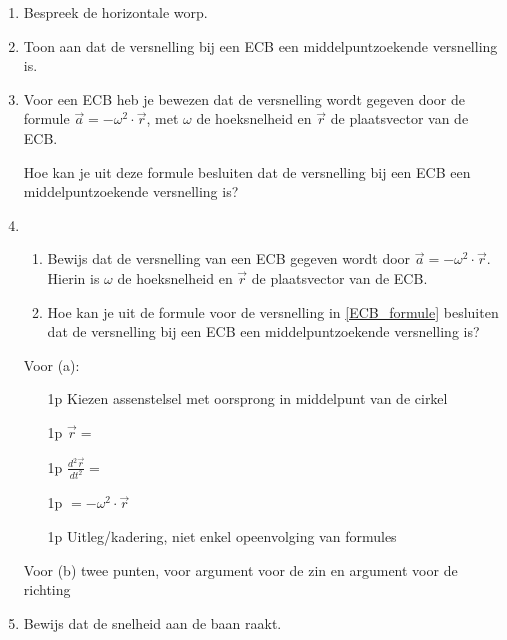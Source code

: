 \documentclass{ximera}
\begin{document}
        \author{Bert Lambregs}


\begin{enumerate}



\item Bespreek de horizontale worp.

\item Toon aan dat de versnelling bij een ECB een middelpuntzoekende versnelling is.

\item Voor een ECB heb je bewezen dat de versnelling wordt gegeven door de formule $\vec{a}=-\omega^2\cdot\vec{r}$, met $\omega$ de hoeksnelheid en $\vec{r}$ de plaatsvector van de ECB. 

Hoe kan je uit deze formule besluiten dat de versnelling bij een ECB een middelpuntzoekende versnelling is?

\item
\begin{enumerate}
	\item\label{ECB_formule} Bewijs dat de versnelling van een ECB gegeven wordt door $\vec{a}=-\omega^2\cdot\vec{r}$. Hierin is $\omega$ de hoeksnelheid en $\vec{r}$ de plaatsvector van de ECB.
	\item Hoe kan je uit de formule voor de versnelling in \ref{ECB_formule} besluiten dat de versnelling bij een ECB een middelpuntzoekende versnelling is?
\end{enumerate}

\begin{oplossing}
Voor (a):
	\begin{enumerate}
		\item[1p] Kiezen assenstelsel met oorsprong in middelpunt van de cirkel
		\item[1p] $\vec{r}=$
		\item[1p] $\frac{d^2 \vec{r}}{dt^2}=$
		\item[1p] $=-\omega^2\cdot\vec{r} $
		\item[1p] Uitleg/kadering, niet enkel opeenvolging van formules
	\end{enumerate}
Voor (b) twee punten, voor argument voor de zin en argument voor de richting
\end{oplossing}

\item Bewijs dat de snelheid aan de baan raakt.








\end{enumerate}
\end{document}

